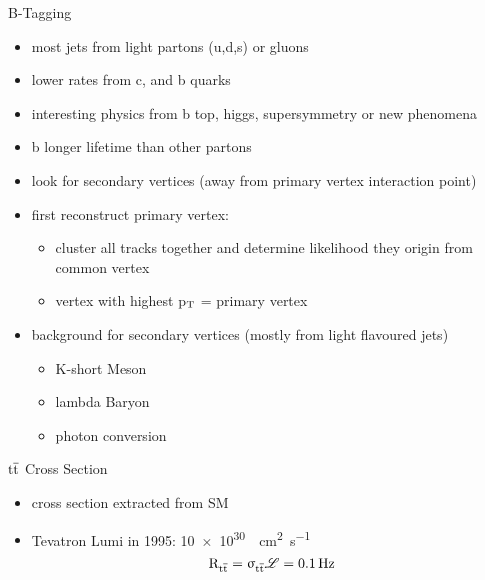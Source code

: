 \begin{frame}{B-Tagging}

	\begin{itemize}\itemfill
		\item most jets from light partons (u,d,s) or gluons
		\item lower rates from c, and b quarks
		\item interesting physics from b \ra top, higgs, supersymmetry or new phenomena
		\item b longer lifetime than other partons
		\item look for secondary vertices (away from primary vertex \ra interaction point)
		\item first reconstruct primary vertex:
		\begin{itemize}
			\item cluster all tracks together and determine likelihood they origin from common vertex
			\item vertex with highest p$_{\text{T}}$ = primary vertex
		\end{itemize}
		
	\end{itemize}
	\begin{minipage}[c][.22\textheight]{.5\textwidth}
		\begin{itemize}
			\item background for secondary vertices (mostly from light flavoured jets)
			\begin{itemize}
				\item K-short Meson
				\item lambda Baryon 
				\item photon conversion 
			\end{itemize}
		\end{itemize}
	\end{minipage}
	\begin{minipage}{.45\textwidth}
	\end{minipage}



\end{frame}
\begin{frame}{$\text{t}\overline{\text{t}}$ Cross Section}

	\vspace*{-10pt}\vspace*{-10pt}
	
	\begin{itemize}\itemfill
		\item cross section extracted from SM
		\item Tevatron Lumi in 1995: \SI{10e30}{\per\centi\meter\squared\per\second}
		\begin{equation*} \text{R}_{\text{t}\overline{\text{t}}} = \upsigma_{\text{t}\overline{\text{t}}}\mathscr{L} = \SI{.1}{\hertz}\end{equation*}

	\end{itemize}

\end{frame}

